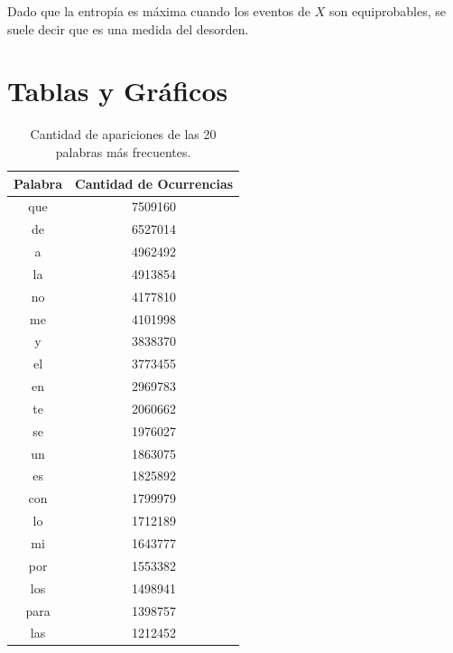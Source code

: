 Dado que la entropía es máxima cuando los eventos de $X$ son equiprobables, se suele decir que es una medida del desorden.


\section{Tablas y Gráficos}
\label{sub:tablas}


\begin{table}[ht]
\centering

\begin{tabular}{ c c }
\toprule
Palabra & Cantidad de Ocurrencias \\ 
\midrule
que     & 7509160                 \\
de      & 6527014                 \\
a       & 4962492                 \\
la      & 4913854                 \\
no      & 4177810                 \\
me      & 4101998                 \\
y       & 3838370                 \\
el      & 3773455                 \\
en      & 2969783                 \\
te      & 2060662                 \\
se      & 1976027                 \\
un      & 1863075                 \\
es      & 1825892                 \\
con     & 1799979                 \\
lo      & 1712189                 \\
mi      & 1643777                 \\
por     & 1553382                 \\
los     & 1498941                 \\
para    & 1398757                 \\
las     & 1212452                 \\
\bottomrule
\end{tabular}
\caption{Cantidad de apariciones de las 20 palabras más frecuentes.}
\label{tab:palabrasMasOcurrentes}
\end{table}



